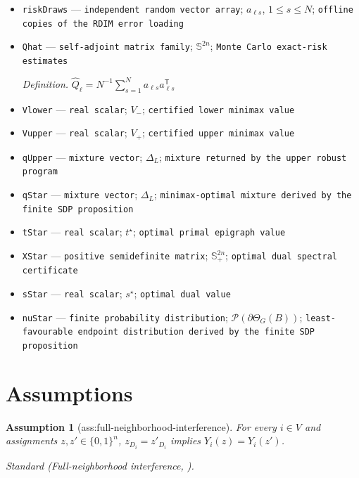 \documentclass{article}
\newtheorem{assumption}{Assumption}
\begin{document}
\begin{itemize}
  \item \texttt{riskDraws} --- \texttt{independent random vector array}; \(a_{\ell s}\), \(1\le s\le N\); \texttt{offline copies of the RDIM error loading}
  \item \texttt{Qhat} --- \texttt{self-\allowbreak{}adjoint matrix family}; \(\mathbb S^{2n}\); \texttt{Monte Carlo exact-\allowbreak{}risk estimates}
  \par\smallskip\noindent\emph{Definition.} \(\widehat Q_{\ell}=N^{-1}\sum_{s=1}^{N}a_{\ell s}a_{\ell s}^{\mathsf T}\)
  \item \texttt{Vlower} --- \texttt{real scalar}; \(V_{-}\); \texttt{certified lower minimax value}
  \item \texttt{Vupper} --- \texttt{real scalar}; \(V_{+}\); \texttt{certified upper minimax value}
  \item \texttt{qUpper} --- \texttt{mixture vector}; \(\Delta_L\); \texttt{mixture returned by the upper robust program}
  \item \texttt{qStar} --- \texttt{mixture vector}; \(\Delta_L\); \texttt{minimax-\allowbreak{}optimal mixture derived by the finite SDP proposition}
  \item \texttt{tStar} --- \texttt{real scalar}; \(t^{\star}\); \texttt{optimal primal epigraph value}
  \item \texttt{XStar} --- \texttt{positive semidefinite matrix}; \(\mathbb S_{+}^{2n}\); \texttt{optimal dual spectral certificate}
  \item \texttt{sStar} --- \texttt{real scalar}; \(s^{\star}\); \texttt{optimal dual value}
  \item \texttt{nuStar} --- \texttt{finite probability distribution}; \(\mathcal P(\partial\Theta_G(B))\); \texttt{least-\allowbreak{}favourable endpoint distribution derived by the finite SDP proposition}
\end{itemize}

\section{Assumptions}

\begin{assumption}[ass:full-neighborhood-interference]\label{ass:full-neighborhood-interference}
For every \(i\in V\) and assignments \(z,z'\in\{0,1\}^{n}\), \(z_{D_i}=z'_{D_i}\) implies \(Y_i(z)=Y_i(z')\).
\par\smallskip\noindent\emph{Standard} (Full-neighborhood interference, \cite{ShiYangQinLi2024}).
\end{assumption}
\end{document}

